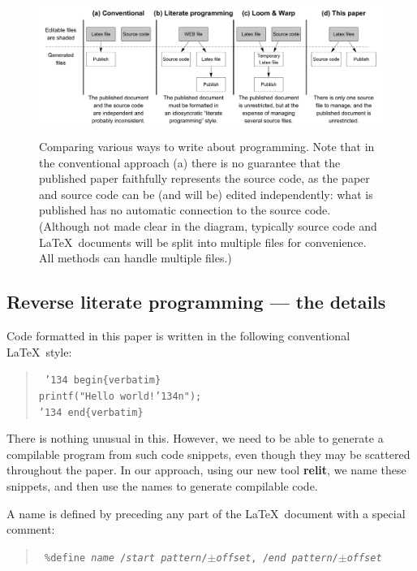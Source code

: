 \documentclass[12pt]{article}
\def\name#1{\textbf{#1}}
\def\mycaption#1{\sf\bfseries\caption{\sf #1}}
\begin{document}
\def\mycaption#1{\sf\bfseries\caption{\sf #1}}
\begin{figure}
\begin{center}
\includegraphics[width=.9\textwidth]{figures/literateProgramming.pdf}
\end{center}
\mycaption{Comparing various ways to write about programming. Note that in the conventional approach (a) there is no guarantee that the published paper faithfully represents the source code, as the paper and source code can be (and will be) edited independently: what is published has no automatic connection to the source code. (Although not made clear in the diagram, typically source code and \LaTeX\ documents will be split into multiple files for convenience. All methods can handle multiple files.)}
\label{fig:lp}
\end{figure}

\subsection{Reverse literate programming --- the details}

Code formatted in this paper is written in the following conventional \LaTeX\ style:

\begin{verse}\tt
\char'134 begin\{verbatim\}\\
printf("Hello world!\char'134n");\\
\char'134 end\{verbatim\}
\end{verse}

There is nothing unusual in this. However, we need to be able to generate a compilable program from such code snippets, even though they may be scattered throughout the paper. In our approach, using our new tool \name{relit}, we name these snippets, and then use the names to generate compilable code.

A name is defined by preceding any part of the \LaTeX\ document with a special comment: 

\begin{verse}\tt
\%{}define \emph{name} /\emph{start pattern}/$\pm$\emph{offset}, /\emph{end pattern}/$\pm$\emph{offset}
\end{verse} 
\end{document}
